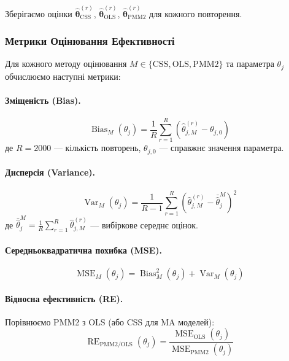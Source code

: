 \documentclass[12pt,a4paper]{article}
\DeclareMathOperator{\Var}{Var}
\DeclareMathOperator{\MSE}{MSE}
\DeclareMathOperator{\Bias}{Bias}
\DeclareMathOperator{\RE}{RE}
\begin{document}
Зберігаємо оцінки $\hat{\boldsymbol{\theta}}^{(r)}_{\text{CSS}}$, $\hat{\boldsymbol{\theta}}^{(r)}_{\text{OLS}}$, $\hat{\boldsymbol{\theta}}^{(r)}_{\text{PMM2}}$ для кожного повторення.

\subsubsection{Метрики Оцінювання Ефективності}

Для кожного методу оцінювання $M \in \{\text{CSS}, \text{OLS}, \text{PMM2}\}$ та параметра $\theta_j$ обчислюємо наступні метрики:

\paragraph{Зміщеність (Bias).}
\begin{equation}
\label{eq:bias}
\Bias_M(\theta_j) = \frac{1}{R} \sum_{r=1}^{R} \left( \hat{\theta}_{j,M}^{(r)} - \theta_{j,0} \right)
\end{equation}
де $R = 2000$ --- кількість повторень, $\theta_{j,0}$ --- справжнє значення параметра.

\paragraph{Дисперсія (Variance).}
\begin{equation}
\label{eq:variance}
\Var_M(\theta_j) = \frac{1}{R-1} \sum_{r=1}^{R} \left( \hat{\theta}_{j,M}^{(r)} - \bar{\hat{\theta}}_j^M \right)^2
\end{equation}
де $\bar{\hat{\theta}}_j^M = \frac{1}{R} \sum_{r=1}^{R} \hat{\theta}_{j,M}^{(r)}$ --- вибіркове середнє оцінок.

\paragraph{Середньоквадратична похибка (MSE).}
\begin{equation}
\label{eq:mse}
\MSE_M(\theta_j) = \Bias_M^2(\theta_j) + \Var_M(\theta_j)
\end{equation}

\paragraph{Відносна ефективність (RE).}

Порівнюємо PMM2 з OLS (або CSS для MA моделей):
\begin{equation}
\label{eq:relative_efficiency_empirical}
\RE_{\text{PMM2/OLS}}(\theta_j) = \frac{\MSE_{\text{OLS}}(\theta_j)}{\MSE_{\text{PMM2}}(\theta_j)}
\end{equation}
\end{document}
